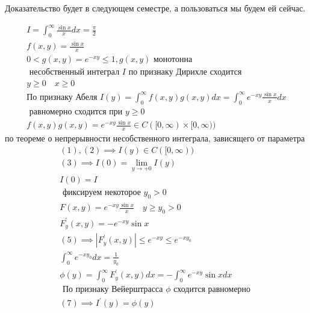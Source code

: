 \documentclass[main]{subfiles}
\begin{document}
     \begin{longProof}
          Доказательство будет в следующем семестре, а пользоваться мы будем ей сейчас.
     \end{longProof}
     \begin{example}
          \begin{gather*}
               I = \int^\infty_0 \frac{\sin x}{x} dx = \frac{\pi}{2} \\
               f(x,y) = \frac{\sin x}{x} \\
              0 < g(x,y) = e^{-xy} \leq 1, g(x,y) \text{ монотонна } \\
               \text{  несобственный интеграл }I \text{ по признаку Дирихле сходится} \\
               y \geq 0 \quad x \geq 0 \\ 
               \text{По признаку Абеля }
                I(y) = \int^\infty_0 f(x,y)g(x,y)dx = \int^\infty_0 e^{-xy} \frac{\sin x}{x}dx \\
                \text{ равномерно сходится при } y \geq 0 \\
               f(x,y)g(x,y) = e^{-xy} \frac{\sin x}{x} \in C([0,\infty) \times [0,\infty) ) \tag{2} \end{gather*}
          по теореме о непрерывности несобственного интеграла, зависящего от параметра
          \begin{gather*}
               (1),(2) \implies I(y) \in C([0,\infty)) \tag{3}\\
               (3) \implies I(0) = \underset{y \to +0}{\lim} I(y) \tag{4}\\
               I(0) = I \\
               \text{ фиксируем некоторое } y_0 > 0\\
               F(x,y) = e^{-xy} \frac{\sin x}{x} \quad y \geq y_0 > 0 \\
               F^\prime_y(x,y) = -e^{-xy} \sin x \tag{5} \\
               (5) \implies |F^\prime_y(x,y)| \leq e^{-xy} \leq e^{-xy_0} \tag{6} \\
               \int^\infty_0 e^{-xy_0} dx = \frac{1}{y_0} \\
               \phi(y) = \int^\infty_0 F^\prime_y(x,y) dx = -\int^\infty_0 e^{-xy} \sin x dx \tag{7}\\
               \text{ По признаку Вейерштрасса } \phi \text{ сходится равномерно } \\
               (7) \implies I^\prime(y) = \phi(y) \tag{8} \\

\end{gather*}
\end{example}
\end{document}
